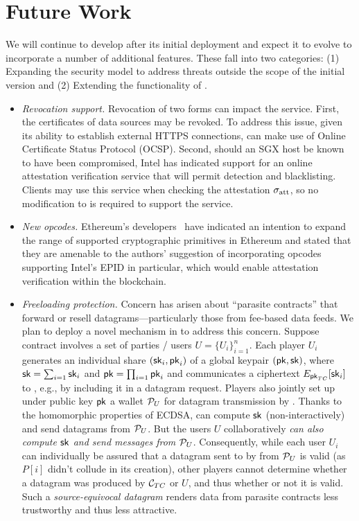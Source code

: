 \section{Future Work}
\label{sec:future}

We will continue to develop \tc after its initial deployment and expect it to evolve to incorporate a number of additional features. These fall into two categories: (1) Expanding the security model to address threats outside the scope of the initial version and (2) Extending the functionality of \tc.


\begin{itemize}
\item{\em Revocation support.} Revocation of two forms can impact the \tc service. First, the certificates of data sources may be revoked. To address this issue, given its ability to establish external HTTPS connections, \tc can make use of Online Certificate Status Protocol (OCSP). Second, should an SGX host be known to have been compromised, Intel has indicated support for an online attestation verification service that will permit detection and blacklisting. Clients may use this service when checking the attestation ${\sigma_{\textrm{att}}}$, so no modification to \tc is required to support the service.
\item{\em New opcodes.} Ethereum's developers~\cite{Buterinpersonal} have indicated an intention to expand the range of supported cryptographic primitives in Ethereum and stated that they are amenable to the authors' suggestion of incorporating opcodes supporting Intel's EPID in particular, which would enable attestation verification within the blockchain. 
\item{\em Freeloading protection.} Concern has arisen about ``parasite contracts'' that forward or resell datagrams---particularly those from fee-based data feeds. We plan to deploy a novel mechanism in \tc to address this concern. Suppose contract \reqcont involves a set of parties / users $U = \{U_i\}_{i=1}^n$. Each player $U_i$ generates an individual share $({\sf sk}_i, {\sf pk}_i)$ of a global keypair $({\sf pk}, {\sf sk})$, where ${\sf sk} = \sum_{i=1} {\sf sk}_i$ and ${\sf pk} = \prod_{i=1} {\sf pk}_i$ and communicates a ciphertext $E_{{\sf pk}_{TC}}[{\sf sk}_i]$ to \tcont, e.g., by including it in a datagram request. Players also jointly set  up under public key ${\sf pk}$ a wallet ${\cal P}_U$ for datagram transmission by \tcont. Thanks to the homomorphic properties of ECDSA, \tcont can compute ${\sf sk}$ (non-interactively) and send datagrams from ${\cal P}_U$. But the users $U$ collaboratively \emph{can also compute ${\sf sk}$ and send messages from ${\cal P}_U$}. Consequently, while each user $U_i$ can individually be assured that a datagram sent to \reqcont by \tcont from ${\cal P}_U$ is valid (as $P[i]$ didn't collude in its creation), other players cannot determine whether a datagram was produced by ${\cal C}_{TC}$ or $U$, and thus whether or not it is valid. Such a \emph{source-equivocal datagram} renders data from parasite contracts less trustworthy and thus less attractive. 

\end{itemize}

